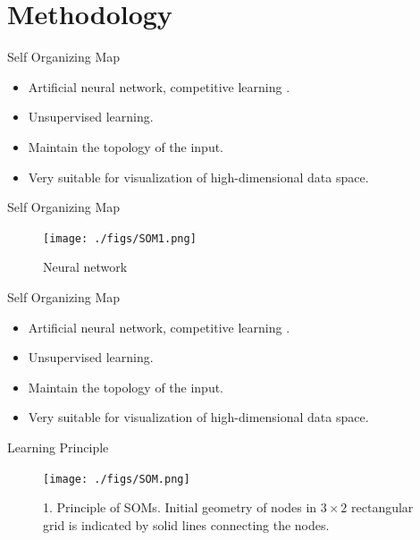 \section{Methodology}

\begin{frame}
\sectionpage
\end{frame}	

\begin{frame}{Self Organizing Map}

\begin{itemize}
\item {
	Artificial neural network, competitive learning .
}
\item {
Unsupervised learning.
}
\item {
	Maintain the topology of the input.
}
\item {
	Very suitable for visualization of high-dimensional data space.
}
\end{itemize}
\end{frame}

\begin{frame}{Self Organizing Map}
\begin{figure}[htbp]
\centering
\texttt{[image: ./figs/SOM1.png]}
\caption{Neural network}
\end{figure}

\end{frame}
\begin{frame}{Self Organizing Map}

\begin{itemize}
\item {
	Artificial neural network, competitive learning .
}
\item {
Unsupervised learning.
}
\item {
		Maintain the topology of the input.
}
\item {
	Very suitable for visualization of high-dimensional data space.
}
\end{itemize}
\end{frame}






\begin{frame}{Learning Principle}


\begin{figure}[htbp]
\texttt{[image: ./figs/SOM.png]}
\caption{ 1. Principle of SOMs. Initial geometry of nodes in $3 \times 2$
rectangular grid is indicated by solid lines connecting the nodes.
}
\end{figure}
\end{frame}



